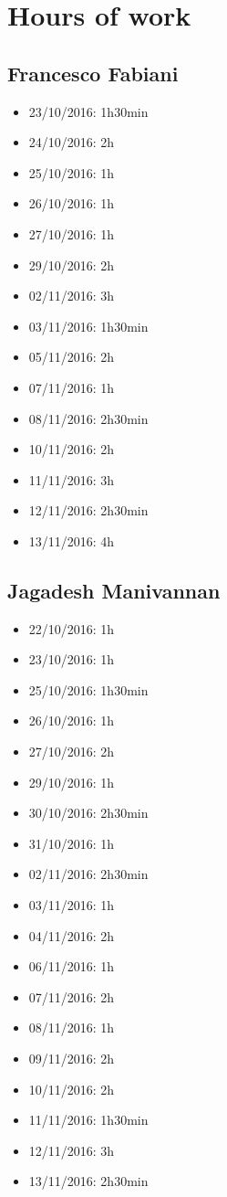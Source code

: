 \chapter{Hours of work}

\section{Francesco Fabiani}
\begin{itemize}
	\item 23/10/2016: 1h30min
	\item 24/10/2016: 2h
	\item 25/10/2016: 1h
	\item 26/10/2016: 1h
	\item 27/10/2016: 1h
	\item 29/10/2016: 2h
	\item 02/11/2016: 3h
	\item 03/11/2016: 1h30min
	\item 05/11/2016: 2h
	\item 07/11/2016: 1h
	\item 08/11/2016: 2h30min
	\item 10/11/2016: 2h
	\item 11/11/2016: 3h
	\item 12/11/2016: 2h30min
	\item 13/11/2016: 4h
\end{itemize}

\section{Jagadesh Manivannan}
\begin{itemize}
	\item 22/10/2016: 1h
	\item 23/10/2016: 1h
	\item 25/10/2016: 1h30min
	\item 26/10/2016: 1h
	\item 27/10/2016: 2h
	\item 29/10/2016: 1h
	\item 30/10/2016: 2h30min
	\item 31/10/2016: 1h
	\item 02/11/2016: 2h30min
	\item 03/11/2016: 1h
	\item 04/11/2016: 2h
	\item 06/11/2016: 1h
	\item 07/11/2016: 2h
	\item 08/11/2016: 1h
	\item 09/11/2016: 2h
	\item 10/11/2016: 2h
	\item 11/11/2016: 1h30min
	\item 12/11/2016: 3h
	\item 13/11/2016: 2h30min
\end{itemize}

